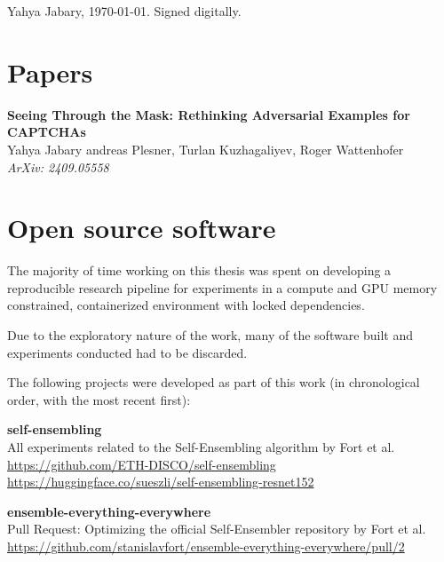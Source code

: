 \documentclass[a4paper, oneside]{discothesis}
\newcommand{\linebreaks}{\vspace*{0.5em}}
\begin{document}
Yahya Jabary, \today. Signed digitally.

\section*{Papers}


\begin{spacing}{1}
	\textbf{Seeing Through the Mask: Rethinking Adversarial Examples for CAPTCHAs} \\
	Yahya Jabary andreas Plesner, Turlan Kuzhagaliyev, Roger Wattenhofer \\
	\textit{ArXiv: 2409.05558}
\end{spacing}

\section*{Open source software}

The majority of time working on this thesis was spent on developing a reproducible research pipeline for experiments in a compute and GPU memory constrained, containerized environment with locked dependencies.

Due to the exploratory nature of the work, many of the software built and experiments conducted had to be discarded.

The following projects were developed as part of this work (in chronological order, with the most recent first):

\linebreaks

\begin{samepage}
	\begin{spacing}{1}
		\textbf{self-ensembling} \\
		All experiments related to the Self-Ensembling algorithm by Fort et al. \\
		\url{https://github.com/ETH-DISCO/self-ensembling} \\
		\url{https://huggingface.co/sueszli/self-ensembling-resnet152}
	\end{spacing}
\end{samepage}

\linebreaks

\begin{samepage}
	\begin{spacing}{1}
		\textbf{ensemble-everything-everywhere} \\
		Pull Request: Optimizing the official Self-Ensembler repository by Fort et al. \\
		\url{https://github.com/stanislavfort/ensemble-everything-everywhere/pull/2}
	\end{spacing}
\end{samepage}
\end{document}
